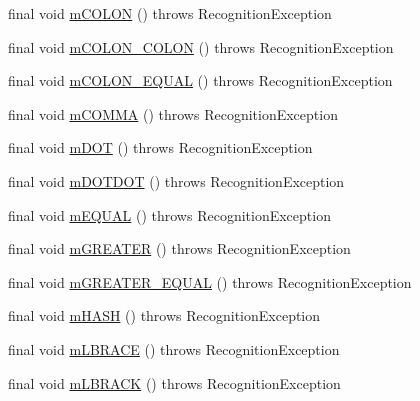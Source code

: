 \begin{DoxyCompactItemize}
\item 
final void \hyperlink{classorg_1_1tzi_1_1use_1_1parser_1_1use_1_1_u_s_e_lexer_ad587a4e2c2ee6af2d05b2454b6f1f029}{m\-C\-O\-L\-O\-N} ()  throws Recognition\-Exception 
\item 
final void \hyperlink{classorg_1_1tzi_1_1use_1_1parser_1_1use_1_1_u_s_e_lexer_a8cba7628751067a53ec697dbcd14591e}{m\-C\-O\-L\-O\-N\-\_\-\-C\-O\-L\-O\-N} ()  throws Recognition\-Exception 
\item 
final void \hyperlink{classorg_1_1tzi_1_1use_1_1parser_1_1use_1_1_u_s_e_lexer_a86a6c928913c4582e2049f5546034f6a}{m\-C\-O\-L\-O\-N\-\_\-\-E\-Q\-U\-A\-L} ()  throws Recognition\-Exception 
\item 
final void \hyperlink{classorg_1_1tzi_1_1use_1_1parser_1_1use_1_1_u_s_e_lexer_ac393df9c00dd25dac4ca21e32a7e0b9c}{m\-C\-O\-M\-M\-A} ()  throws Recognition\-Exception 
\item 
final void \hyperlink{classorg_1_1tzi_1_1use_1_1parser_1_1use_1_1_u_s_e_lexer_a1e9f66094146b9a4122777d8ccd439ca}{m\-D\-O\-T} ()  throws Recognition\-Exception 
\item 
final void \hyperlink{classorg_1_1tzi_1_1use_1_1parser_1_1use_1_1_u_s_e_lexer_ad7f694c1e16477dda0397b2690ec5313}{m\-D\-O\-T\-D\-O\-T} ()  throws Recognition\-Exception 
\item 
final void \hyperlink{classorg_1_1tzi_1_1use_1_1parser_1_1use_1_1_u_s_e_lexer_a93f228e8e8ede47df26680a7e573ac40}{m\-E\-Q\-U\-A\-L} ()  throws Recognition\-Exception 
\item 
final void \hyperlink{classorg_1_1tzi_1_1use_1_1parser_1_1use_1_1_u_s_e_lexer_a610d4a60722f84b6a765a028c1d33e56}{m\-G\-R\-E\-A\-T\-E\-R} ()  throws Recognition\-Exception 
\item 
final void \hyperlink{classorg_1_1tzi_1_1use_1_1parser_1_1use_1_1_u_s_e_lexer_ae3b447244802dfbd52cd5c186b8ccf8f}{m\-G\-R\-E\-A\-T\-E\-R\-\_\-\-E\-Q\-U\-A\-L} ()  throws Recognition\-Exception 
\item 
final void \hyperlink{classorg_1_1tzi_1_1use_1_1parser_1_1use_1_1_u_s_e_lexer_a25693f1a6eadd98fbd00789ce83b9c84}{m\-H\-A\-S\-H} ()  throws Recognition\-Exception 
\item 
final void \hyperlink{classorg_1_1tzi_1_1use_1_1parser_1_1use_1_1_u_s_e_lexer_afc8dedc48a44478f9623daf07948e717}{m\-L\-B\-R\-A\-C\-E} ()  throws Recognition\-Exception 
\item 
final void \hyperlink{classorg_1_1tzi_1_1use_1_1parser_1_1use_1_1_u_s_e_lexer_a5ea50c224cab80b3324bf6338404516c}{m\-L\-B\-R\-A\-C\-K} ()  throws Recognition\-Exception 

\end{DoxyCompactItemize}
